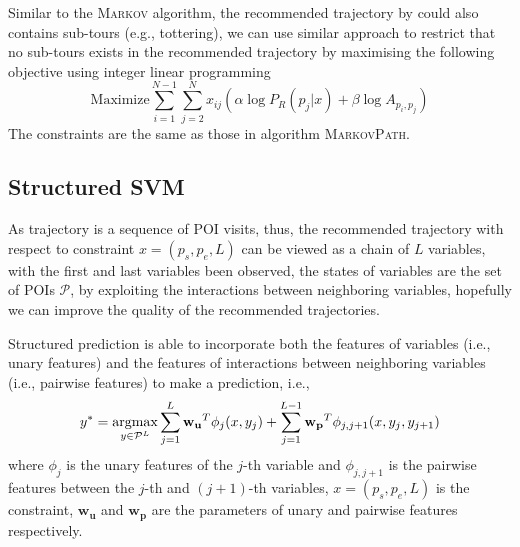 Similar to the \textsc{Markov} algorithm,
the recommended trajectory by  could also contains sub-tours (e.g., tottering),
we can use similar approach to restrict that no sub-tours exists in the recommended trajectory 
by maximising the following objective using integer linear programming
\begin{displaymath}
    \text{Maximize}  \sum_{i=1}^{N-1} \sum_{j=2}^N x_{ij} (\alpha \log P_R(p_j | x) + \beta \log A_{p_i, p_j}) 
\end{displaymath}
The constraints are the same as those in algorithm \textsc{MarkovPath}.

\subsection{Structured SVM}
\label{ssvm}
As trajectory is a sequence of POI visits,
thus, the recommended trajectory with respect to constraint $x = (p_s, p_e, L)$
can be viewed as a chain of $L$ variables,
with the first and last variables been observed, the states of variables are the set of POIs $\mathcal{P}$,
by exploiting the interactions between neighboring variables,
hopefully we can improve the quality of the recommended trajectories.

Structured prediction is able to incorporate both the features of variables (i.e., unary features) and
the features of interactions between neighboring variables (i.e., pairwise features) to make a prediction, i.e.,
\begin{displaymath}
    y^* = \operatorname*{argmax}_{y \in \mathcal{P}^L} \sum_{j=1}^L \mathbf{w_u}^T \phi_j(x, y_j) +
                                        \sum_{j=1}^{L-1} \mathbf{w_p}^T \phi_{j, j+1}(x, y_j, y_{j+1})
\end{displaymath}
where $\phi_j$ is the unary features of the $j$-th variable and $\phi_{j, j+1}$ is the pairwise features between
the $j$-th and $(j+1)$-th variables, $x = (p_s, p_e, L)$ is the constraint, $\mathbf{w_u}$ and $\mathbf{w_p}$ are the
parameters of unary and pairwise features respectively.

